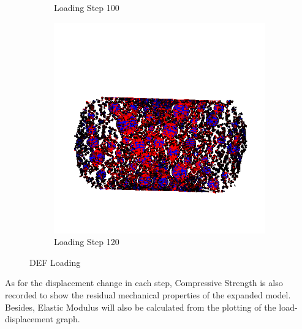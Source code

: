\begin{figure}[ht]
\begin{subfigure}{.33\textwidth}
      \caption{Loading Step 100}
      \end{subfigure}%
      \begin{subfigure}{.33\textwidth}
        \centering
        \includegraphics[width=1.0\linewidth]{Files/A30X-5C_3_IS/DEP50-STEP(120).png}
        \caption{Loading Step 120}
      \end{subfigure}

  \caption{DEF Loading}
  \label{fig:DEF_Loading}
\end{figure}


As for the displacement change in each step, Compressive Strength is also recorded to show the residual mechanical properties of the expanded model. Besides, Elastic Modulus will also be calculated from the plotting of the load-displacement graph.









